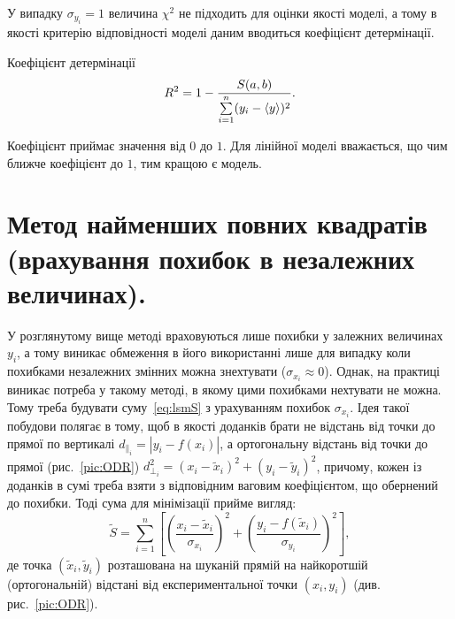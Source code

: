 \documentclass{LabBook}
\begin{document}
  У випадку $\sigma_{y_i} = 1$ величина $\chi^2$ не підходить для оцінки якості моделі, а тому в якості критерію відповідності моделі даним вводиться коефіцієнт детермінації.

  \begin{More}{Коефіцієнт детермінації}
    \begin{equation}\label{}
      R^2 = 1 - \frac{S(a,b)}{\sum\limits_{i = 1}^n (y_i - \left\langle y \right\rangle)^2}.
    \end{equation}

    Коефіцієнт приймає значення від $0$ до $1$. Для лінійної моделі вважається, що чим ближче коефіцієнт до $1$, тим кращою є модель.
  \end{More}


\section{Метод найменших повних квадратів (врахування похибок в незалежних величинах).}


  У розглянутому вище методі враховуються лише похибки у залежних величинах $y_i$, а тому виникає обмеження в його використанні лише для випадку коли похибками незалежних змінних можна знехтувати ($\sigma_{x_i} \approx 0$).  Однак, на практиці виникає потреба у такому методі, в якому цими похибками нехтувати не можна. Тому треба будувати суму~\eqref{eq:lsmS} з урахуванням похибок $\sigma_{x_i}$. Ідея такої побудови полягає в тому, щоб в якості
  доданків брати не відстань від точки до прямої по вертикалі $d_{\parallel_i} = |y_i - f(x_i)|$, а ортогональну відстань від точки до прямої (рис.~\ref{pic:ODR}) $d^2_{\perp_i} = (x_i - \tilde{x}_i)^2  + (y_i - \tilde{y}_i)^2$, причому, кожен із доданків в сумі треба взяти з відповідним ваговим коефіцієнтом, що обернений до похибки. Тоді сума для мінімізації прийме вигляд:
  \begin{equation}\label{eq:lsmODR}
    \tilde{S} = \sum\limits_{i = 1}^n  \left[\left(\frac{x_i - \tilde{x}_i}{\sigma_{x_i}}\right)^2 + \left(\frac{y_i - f(\tilde{x}_i)}{\sigma_{y_i}}\right)^2\right],
  \end{equation}
  де точка $(\tilde{x}_i,\tilde{y}_i)$ розташована на шуканій прямій на найкоротшій (ортогональній) відстані від експериментальної точки $(x_i, y_i)$ (див. рис.~\ref{pic:ODR}).
\end{document}
